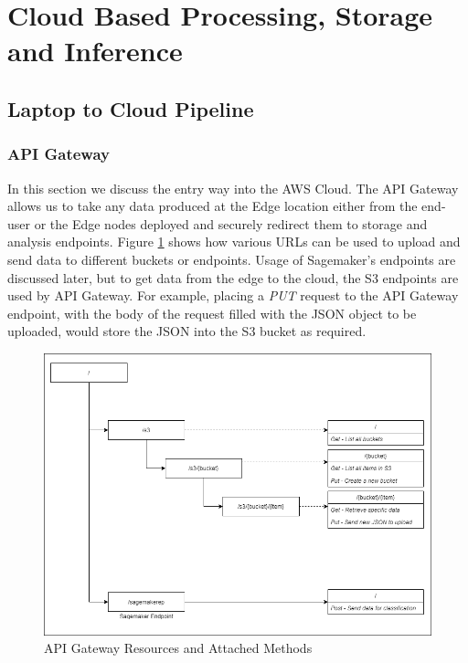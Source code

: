 \section{Cloud Based Processing, Storage and Inference}
\label{cloud_services}
\subsection{Laptop to Cloud Pipeline}
\subsubsection{API Gateway}
\label{api_gateway_design}
In this section we discuss the entry way into the AWS Cloud. The API Gateway allows us to take any data produced at the Edge location either from the end-user or the Edge nodes deployed and securely redirect them to storage and analysis endpoints. Figure \ref{fig:api_gateway_methods} shows how various URLs can be used to upload and send data to different buckets or endpoints. Usage of Sagemaker's endpoints are discussed later, but to get data from the edge to the cloud, the S3 endpoints are used by API Gateway. For example, placing a \textit{PUT} request to the API Gateway endpoint, with the body of the request filled with the JSON object to be uploaded, would store the JSON into the S3 bucket as required. 

\begin{figure}[ht]
    \centering
    \includegraphics[width=1\linewidth]{pages/Chapter4/Chapter 4 Images/api_gateway_1.png}
    \caption{API Gateway Resources and Attached Methods}
    \label{fig:api_gateway_methods}
\end{figure}


